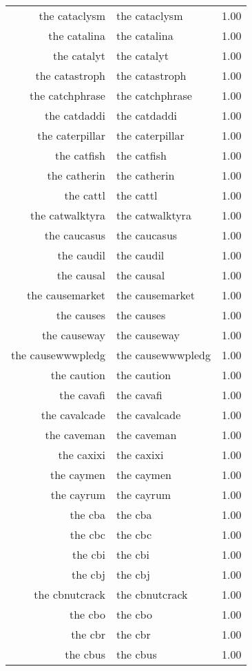 \begin{table}[ht]
\begin{tabular}{rlr}
  the cataclysm & the cataclysm & 1.00 \\ 
  the catalina & the catalina & 1.00 \\ 
  the catalyt & the catalyt & 1.00 \\ 
  the catastroph & the catastroph & 1.00 \\ 
  the catchphrase & the catchphrase & 1.00 \\ 
  the catdaddi & the catdaddi & 1.00 \\ 
  the caterpillar & the caterpillar & 1.00 \\ 
  the catfish & the catfish & 1.00 \\ 
  the catherin & the catherin & 1.00 \\ 
  the cattl & the cattl & 1.00 \\ 
  the catwalktyra & the catwalktyra & 1.00 \\ 
  the caucasus & the caucasus & 1.00 \\ 
  the caudil & the caudil & 1.00 \\ 
  the causal & the causal & 1.00 \\ 
  the causemarket & the causemarket & 1.00 \\ 
  the causes & the causes & 1.00 \\ 
  the causeway & the causeway & 1.00 \\ 
  the causewwwpledg & the causewwwpledg & 1.00 \\ 
  the caution & the caution & 1.00 \\ 
  the cavafi & the cavafi & 1.00 \\ 
  the cavalcade & the cavalcade & 1.00 \\ 
  the caveman & the caveman & 1.00 \\ 
  the caxixi & the caxixi & 1.00 \\ 
  the caymen & the caymen & 1.00 \\ 
  the cayrum & the cayrum & 1.00 \\ 
  the cba & the cba & 1.00 \\ 
  the cbc & the cbc & 1.00 \\ 
  the cbi & the cbi & 1.00 \\ 
  the cbj & the cbj & 1.00 \\ 
  the cbnutcrack & the cbnutcrack & 1.00 \\ 
  the cbo & the cbo & 1.00 \\ 
  the cbr & the cbr & 1.00 \\ 
  the cbus & the cbus & 1.00 \\ 

\end{tabular}
\end{table}
